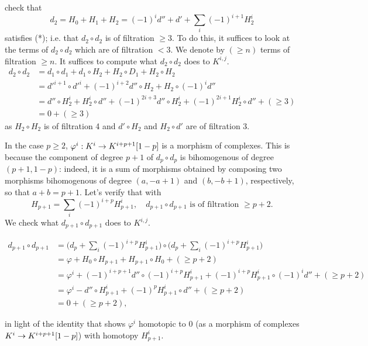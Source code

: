 \documentclass[deligne.tex]{subfiles}
\begin{document}
check that
\begin{equation*}
	d_2=H_0+H_1+H_2=(-1)^id''+d'+\sum_i(-1)^{i+1}H_2^i
\end{equation*}
satisfies (*); i.e. that $d_2\circ d_2$ is of filtration $\geq3$.
To do this, it suffices to look at the terms of $d_2\circ d_2$ which are
of filtration $<3$. We denote by $(\geq n)$ terms of filtration $\geq n$.
It suffices to compute what $d_2\circ d_2$ does to $K^{i,j}$.
\begin{align*}
	d_2\circ d_2
	&=d_1\circ d_1+d_1\circ H_2+H_2\circ D_1+H_2\circ H_2 \\
	&=d'^{i+1}\circ d'^i+(-1)^{i+2}d''\circ H_2+H_2\circ(-1)^id'' \\
	&=d''\circ H_2^i+H_2^i\circ d''+(-1)^{2i+3}d''\circ H_2^i+(-1)^{2i+1}H_2^i\circ d''+(\geq3) \\
	&=0+(\geq3)
\end{align*}
as $H_2\circ H_2$ is of filtration 4 and $d'\circ H_2$ and
$H_2\circ d'$ are of filtration 3.

In the case $p\geq2$, $\varphi^i:K^i\rightarrow K^{i+p+1}[1-p]$ is a morphism of
complexes. This is because the component of degree $p+1$ of $d_p\circ d_p$
is bihomogenous of degree $(p+1,1-p)$: indeed, it is a sum of morphisms
obtained by composing two morphisms bihomogenous of degree $(a,-a+1)$ and
$(b,-b+1)$, respectively, so that $a+b=p+1$. Let's verify that with
\begin{equation*}
	H_{p+1}=\sum_i(-1)^{i+p}H^i_{p+1},\quad
	d_{p+1}\circ d_{p+1}\,\,\text{is of filtration $\geq p+2$.}
\end{equation*}
We check what $d_{p+1}\circ d_{p+1}$ does to $K^{i,j}$.
\begin{ceqn}\begin{align*}
	d_{p+1}\circ d_{p+1}
	&=\Big(d_p+\sum_i(-1)^{i+p}H_{p+1}^i\Big)\circ\Big(d_p+\sum_i(-1)^{i+p}H_{p+1}^i\Big) \\
	&=\varphi+H_0\circ H_{p+1}+H_{p+1}\circ H_0+(\geq p+2) \\
	&=\varphi^i+(-1)^{i+p+1}d''\circ (-1)^{i+p}H_{p+1}^i+(-1)^{i+p}H^i_{p+1}\circ (-1)^id''+(\geq p+2) \\
	&=\varphi^i-d''\circ H^i_{p+1}+(-1)^pH_{p+1}^i\circ d''+(\geq p+2) \\
	&=0+(\geq p+2),
\end{align*}\end{ceqn}
in light of the identity that shows $\varphi^i$ homotopic to 0 (as a 
morphism of complexes $K^i\rightarrow K^{i+p+1}[1-p]$) with homotopy $H^i_{p+1}$.
\end{document}
